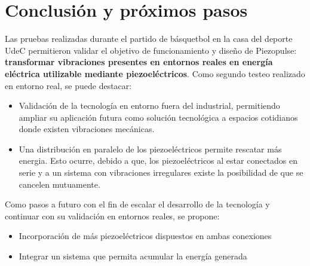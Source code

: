 \documentclass{article}
\begin{document}
\section{Conclusión y próximos pasos}
Las pruebas realizadas durante el partido de básquetbol en la casa del deporte UdeC permitieron validar el objetivo de funcionamiento y diseño de Piezopulse: \textbf{transformar vibraciones presentes en entornos reales en energía eléctrica utilizable mediante piezoeléctricos}. Como segundo testeo realizado en entorno real, se puede destacar:
\begin{itemize}
    \item Validación de la tecnología en entorno fuera del industrial, permitiendo ampliar su aplicación futura como solución tecnológica a espacios cotidianos donde existen vibraciones mecánicas.
    \item Una distribución en paralelo de los piezoeléctricos permite rescatar más energia. Esto ocurre, debido a que, los piezoeléctricos al estar conectados en serie y a un sistema con vibraciones irregulares existe la posibilidad de que se cancelen mutuamente.
\end{itemize}
Como pasos a futuro con el fin de escalar el desarrollo de la tecnología y continuar con su validación en entornos reales, se propone:
\begin{itemize}
    \item Incorporación de más piezoeléctricos dispuestos en ambas conexiones
    \item Integrar un sistema que permita acumular la energía generada 
\end{itemize}
\printbibliography
\end{document}
